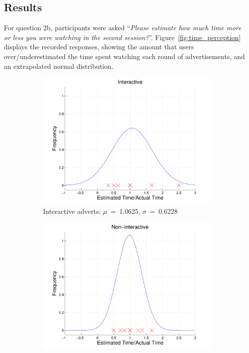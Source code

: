 	\subsection{Results}


	For question 2b, participants were asked ``\textit{Please estimate how much time more or less you were watching in the second session?}''. Figure~\ref{fig:time_perception} displays the recorded responses, showing the amount that users over/underestimated the time spent watching each round of advertisements, and an extrapolated normal distribution.

	\begin{figure}[!h]
		\centering
		\begin{subfigure}[h]{0.49\textwidth}
			\centering
			\includegraphics[width=\textwidth]{images/interactive_bell.pdf}
			\caption{Interactive adverts: $\mu$~=~1.0625, $\sigma$~=~0.6228}
		\end{subfigure}
		\begin{subfigure}[h]{0.49\textwidth}
			\centering
			\includegraphics[width=\textwidth]{images/noninteractive_bell.pdf}

\end{subfigure}
\end{figure}

